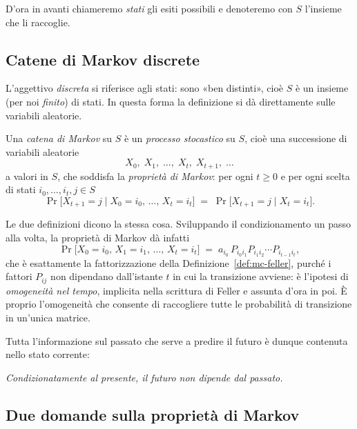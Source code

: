 D'ora in avanti chiameremo \emph{stati} gli esiti possibili e denoteremo con $S$
l'insieme che li raccoglie.

\subsection{Catene di Markov discrete}

L'aggettivo \emph{discreta} si riferisce agli stati: sono «ben distinti», cioè $S$ è un
insieme (per noi \emph{finito}) di stati. In questa forma la definizione si dà
direttamente sulle variabili aleatorie.

\begin{definizione}\label{def:catena-markov}
  Una \emph{catena di Markov} su $S$ è un \emph{processo stocastico} su $S$, cioè una
  successione di variabili aleatorie
  \[
    X_0,\; X_1,\; \dots,\; X_t,\; X_{t+1},\; \dots
  \]
  a valori in $S$, che soddisfa la \emph{proprietà di Markov}: per ogni $t \ge 0$ e per
  ogni scelta di stati $i_0, \dots, i_t, j \in S$
  \[
    \Pr\bigl[X_{t+1} = j \;\big|\; X_0 = i_0,\, \dots,\, X_t = i_t\bigr]
    \;=\;
    \Pr\bigl[X_{t+1} = j \;\big|\; X_t = i_t\bigr].
  \]
\end{definizione}

\begin{osservazione}
  Le due definizioni dicono la stessa cosa. Sviluppando il condizionamento un passo
  alla volta, la proprietà di Markov dà infatti
  \[
    \Pr\bigl[X_0 = i_0,\, X_1 = i_1,\, \dots,\, X_t = i_t\bigr]
    \;=\; a_{i_0}\, P_{i_0 i_1} P_{i_1 i_2} \cdots P_{i_{t-1} i_t},
  \]
  che è esattamente la fattorizzazione della Definizione~\ref{def:mc-feller}, purché i fattori
  $P_{ij}$ non dipendano dall'istante $t$ in cui la transizione avviene: è l'ipotesi di
  \emph{omogeneità nel tempo}, implicita nella scrittura di Feller e assunta d'ora in
  poi. È proprio l'omogeneità che consente di raccogliere tutte le probabilità di
  transizione in un'unica matrice.
\end{osservazione}

Tutta l'informazione sul passato che serve a predire il futuro è dunque contenuta nello
stato corrente:

\begin{center}
  \emph{Condizionatamente al presente, il futuro non dipende dal passato.}
\end{center}

\subsection{Due domande sulla proprietà di Markov}

